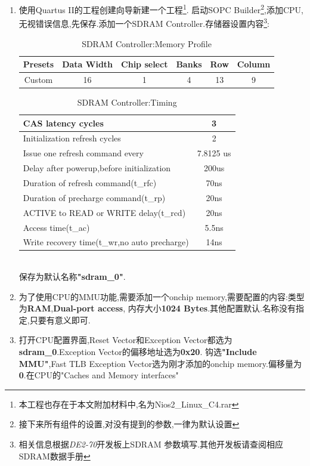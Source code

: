 \documentclass[12pt,a4paper,titlepage]{article}
\begin{document}
\begin{enumerate}
\item 使用Quartus II的工程创建向导新建一个工程\footnote{本工程也存在于本文附加材料中,名为Nios2\_Linux\_C4.rar}.
启动SOPC Builder\footnote{{接下来所有组件的设置,对没有提到的参数,一律为默认设置}},添加CPU,
{无视错误信息},先保存.添加一个SDRAM Controller.存储器设置内容\footnote{相关信息根据\textit{DE2-70}开发板上SDRAM
参数填写.其他开发板请查阅相应SDRAM数据手册}:
\begin{table}[!bhtp]
\centering
\begin{tabular}{|c|c|c|c|c|c|}
\hline
Presets & Data Width & Chip select & Banks & Row & Column \\
\hline
Custom & 16 & 1 & 4 & 13 & 9\\
\hline
\end{tabular}
\caption{SDRAM Controller:Memory Profile}
\end{table}
\begin{table}[!bhtp]
\centering
\begin{tabular}{|l|c|}\hline
CAS latency cycles & 3\\\hline
Initialization refresh cycles & 2\\\hline
Issue one refresh command every & 7.8125 us\\\hline
Delay after powerup,before initialization & 200us\\\hline
Duration of refresh command(t\_rfc) & 70ns\\\hline
Duration of precharge command(t\_rp) & 20ns\\\hline
ACTIVE to READ or WRITE delay(t\_rcd) & 20ns\\\hline
Access time(t\_ac) & 5.5ns\\\hline
Write recovery time(t\_wr,no auto precharge) & 14ns\\\hline
\end{tabular}
\caption{SDRAM Controller:Timing}
\end{table}
\\保存为默认名称\textbf{"sdram\_0"}.
\item 为了使用CPU的MMU功能,需要添加一个onchip memory,需要配置的内容:类型为\textbf{RAM},\textbf{Dual-port access},
内存大小\textbf{1024 Bytes}.其他配置默认.名称没有指定,只要有意义即可.
\item 打开CPU配置界面,Reset Vector和Exception Vector都选为\textbf{sdram\_0}.Exception Vector的偏移地址选为\textbf{0x20}.
钩选\textbf{"Include MMU"},Fast TLB Exception Vector选为刚才添加的onchip memory.偏移量为\textbf{0}.在CPU的"Caches and Memory interfaces"

\end{enumerate}
\end{document}
